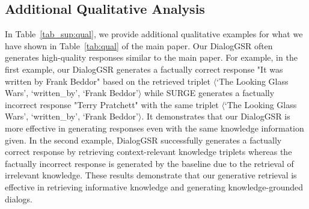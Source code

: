 




\subsection{Additional Qualitative Analysis}
\label{supp:add_qual}
In Table~\ref{tab_sup:qual}, we provide additional qualitative examples for what we have shown in Table~\ref{tab:qual} of the main paper.
Our DialogGSR often generates high-quality responses similar to the main paper.
For example, in the first example, our DialogGSR generates a factually correct response "It was written by Frank Beddor" based on the retrieved triplet $\langle$`The Looking Glass Wars', `written\_by', `Frank Beddor'$\rangle$ while SURGE generates a factually incorrect response "Terry Pratchett" with the same triplet $\langle$`The Looking Glass Wars', `written\_by', `Frank Beddor'$\rangle$.
It demonstrates that our DialogGSR is more effective in generating responses even with the same knowledge information given. 
In the second example, DialogGSR successfully generates a factually correct response by retrieving context-relevant knowledge triplets whereas the factually incorrect response is generated by the baseline due to the retrieval of irrelevant knowledge.
These results demonstrate that our generative retrieval is effective in retrieving informative knowledge and generating knowledge-grounded dialogs.

